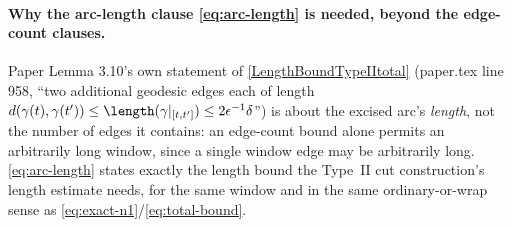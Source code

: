 \begin{lemma}
  \paragraph{Why the arc-length clause \eqref{eq:arc-length} is needed, beyond the edge-count
  clauses.} Paper Lemma 3.10's own statement of \eqref{LengthBoundTypeIItotal} (paper.tex line 958,
  ``two additional geodesic edges each of length $d(\gamma(t),\gamma(t'))\le\length(\gamma|_{[t,t']})
  \le 2\epsilon^{-1}\delta$'') is about the excised arc's \emph{length}, not the number of edges it
  contains: an edge-count bound alone permits an arbitrarily long window, since a single window edge
  may be arbitrarily long. \eqref{eq:arc-length} states exactly the length bound the Type~II cut
  construction's length estimate needs, for the same window and in the same ordinary-or-wrap sense
  as \eqref{eq:exact-n1}/\eqref{eq:total-bound}.
\end{lemma}
